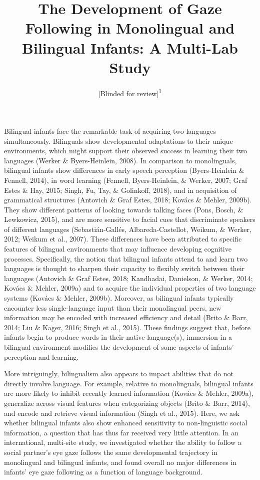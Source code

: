 \documentclass[,man,floatsintext]{apa6}
\title{The Development of Gaze Following in Monolingual and Bilingual Infants: A Multi-Lab Study}
\author{{[}Blinded for review{]}\textsuperscript{1}}
\date{}
\affiliation{
\vspace{0.5cm}
\textsuperscript{1} [Blinded for review]}
\begin{document}
\maketitle

Bilingual infants face the remarkable task of acquiring two languages simultaneously. Bilinguals show developmental adaptations to their unique environments, which might support their observed success in learning their two languages (Werker \& Byers-Heinlein, 2008). In comparison to monolinguals, bilingual infants show differences in early speech perception (Byers-Heinlein \& Fennell, 2014), in word learning (Fennell, Byers-Heinlein, \& Werker, 2007; Graf Estes \& Hay, 2015; Singh, Fu, Tay, \& Golinkoff, 2018), and in acquisition of grammatical structures (Antovich \& Graf Estes, 2018; Kovács \& Mehler, 2009b). They show different patterns of looking towards talking faces (Pons, Bosch, \& Lewkowicz, 2015), and are more sensitive to facial cues that discriminate speakers of different languages (Sebastián-Gallés, Albareda-Castellot, Weikum, \& Werker, 2012; Weikum et al., 2007). These differences have been attributed to specific features of bilingual environments that may influence developing cognitive processes. Specifically, the notion that bilingual infants attend to and learn two languages is thought to sharpen their capacity to flexibly switch between their languages (Antovich \& Graf Estes, 2018; Kandhadai, Danielson, \& Werker, 2014; Kovács \& Mehler, 2009a) and to acquire the individual properties of two language systems (Kovács \& Mehler, 2009b). Moreover, as bilingual infants typically encounter less single-language input than their monolingual peers, new information may be encoded with increased efficiency and detail (Brito \& Barr, 2014; Liu \& Kager, 2016; Singh et al., 2015). These findings suggest that, before infants begin to produce words in their native language(s), immersion in a bilingual environment modifies the development of some aspects of infants' perception and learning.

More intriguingly, bilingualism also appears to impact abilities that do not directly involve language. For example, relative to monolinguals, bilingual infants are more likely to inhibit recently learned information (Kovács \& Mehler, 2009a), generalize across visual features when categorizing objects (Brito \& Barr, 2014), and encode and retrieve visual information (Singh et al., 2015). Here, we ask whether bilingual infants also show enhanced sensitivity to non-linguistic social information, a question that has thus far received very little attention. In an international, multi-site study, we investigated whether the ability to follow a social partner's eye gaze follows the same developmental trajectory in monolingual and bilingual infants, and found overall no major differences in infants' eye gaze following as a function of language background.
\end{document}

